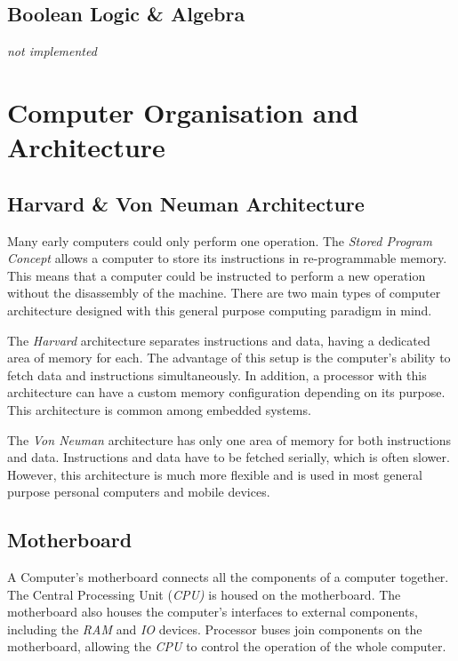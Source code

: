 \documentclass[9pt]{article}
\let\oldsection\section
\renewcommand\section{\clearpage\oldsection}
\begin{document}
\subsection{Boolean Logic \& Algebra}
\label{sec:org7d2f1c0}

\emph{not implemented}

\section{Computer Organisation and Architecture}
\label{sec:orga4c0cda}
\subsection{Harvard \& Von Neuman Architecture}
\label{sec:org88062bc}

Many early computers could only perform one operation. The \emph{Stored Program Concept} allows a computer to store its instructions in re-programmable memory. This means that a computer could be instructed to perform a new operation without the disassembly of the machine. There are two main types of computer architecture designed with this general purpose computing paradigm in mind.

The \emph{Harvard} architecture separates instructions and data, having a dedicated area of memory for each. The advantage of this setup is the computer's ability to fetch data and instructions simultaneously. In addition, a processor with this architecture can have a custom memory configuration depending on its purpose. This architecture is common among embedded systems.

The \emph{Von Neuman} architecture has only one area of memory for both instructions and data. Instructions and data have to be fetched serially, which is often slower. However, this architecture is much more flexible and is used in most general purpose personal computers and mobile devices.

\subsection{Motherboard}
\label{sec:org4244cd9}

A Computer's motherboard connects all the components of a computer together. The Central Processing Unit (\emph{CPU)} is housed on the motherboard. The motherboard also houses the computer's interfaces to external components, including the \emph{RAM} and \emph{IO} devices. Processor buses join components on the motherboard, allowing the \emph{CPU} to control the operation of the whole computer.
\end{document}
